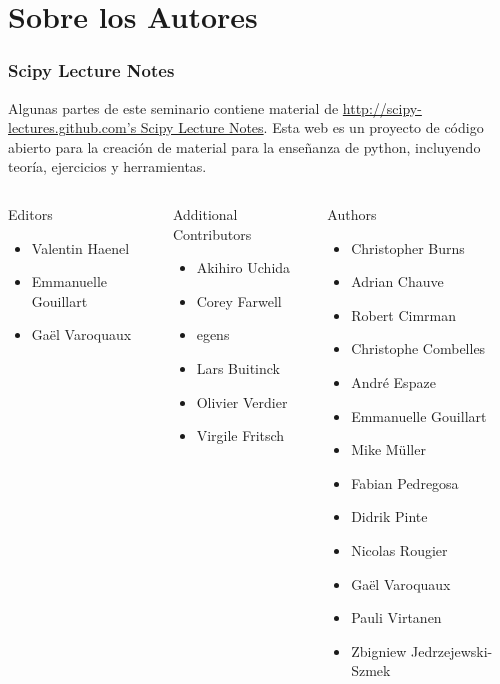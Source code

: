 \documentclass[colorlinks,10pt]{beamer}
\begin{document}
\section{Sobre los Autores}
\begin{frame}[shrink]\frametitle{Scipy Lecture Notes}
    \small Algunas partes de este seminario contiene material de \href{http://scipy-lectures.github.com/}{http://scipy-lectures.github.com's Scipy Lecture Notes}. Esta web es un proyecto de código abierto para la creación de material para la enseñanza de python, incluyendo teoría, ejercicios y herramientas.

    \Tiny
\begin{columns}[c]
\begin{block}{Editors}
\begin{itemize}
    \item Valentin Haenel
    \item Emmanuelle Gouillart
    \item  Gaël Varoquaux
\end{itemize}          
\end{block}
\begin{block}{Additional Contributors}

    \begin{itemize}  
        \item  Akihiro Uchida
        \item Corey Farwell
        \item egens
        \item Lars Buitinck
        \item  Olivier Verdier
        \item Virgile Fritsch
    \end{itemize}
\end{block}

\begin{block}{Authors}
\begin{itemize}
    \item  Christopher Burns
    \item Adrian Chauve
    \item Robert Cimrman
    \item Christophe Combelles
    \item André Espaze
    \item Emmanuelle Gouillart
    \item Mike Müller
    \item Fabian Pedregosa
    \item Didrik Pinte
    \item Nicolas Rougier
    \item Gaël Varoquaux
    \item Pauli Virtanen
    \item Zbigniew Jedrzejewski-Szmek
\end{itemize}
\end{block}
\end{columns}

\end{frame}
\end{document}
